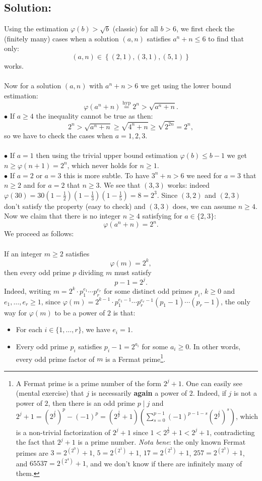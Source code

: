 \documentclass[11pt, a4paper, oneside]{article}
\newcommand{\solution}[1][]{\subsection*{#1}\hfill \par}
\theoremstyle{remark}
\theoremstyle{lemma}
\begin{document}
\solution[Solution:]
Using the estimation \(\varphi(b) > \sqrt{b}\) (classic) for all \(b > 6\), we first check the (finitely many) cases when a solution \((a,n)\) satisfies \(a^n + n \le 6\) to find that only:
\[
(a,n) \in \left\{ (2,1), (3,1), (5,1) \right\}
\]
works.
\\\\
Now for a solution \((a,n)\) with \(a^n + n > 6\) we get using the lower bound estimation:
\[
\varphi \left( a^n + n \right) \overset{\text{hyp}}{=} 2^n > \sqrt{a^n + n}.
\]
\(\bullet\) If \(a \ge 4\) the inequality cannot be true as then:
\[
2^n > \sqrt{a^n + n} \geq \sqrt{4^n + n} \geq \sqrt{2^{2n}} = 2^n,
\]
so we have to check the cases when \(a = 1, 2, 3\).
\\\\
\(\bullet\) If \(a = 1\) then using the trivial upper bound estimation \(\varphi(b) \leq b - 1\) we get \(n \geq \varphi(n + 1) = 2^n\), which never holds for \(n \geq 1\).
\\
\(\bullet\) If \(a = 2\) or \(a = 3\) this is more subtle. To have \(3^n + n > 6\) we need for \(a = 3\) that \(n \geq 2\) and for \(a = 2\) that \(n \geq 3\). We see that \((3,3)\) works: indeed \(\varphi(30) = 30 \left(1 - \frac{1}{2}\right) \left(1 - \frac{1}{3}\right) \left(1 - \frac{1}{5}\right) = 8 = 2^3\). Since \((3,2)\) and \((2,3)\) don't satisfy the property (easy to check) and \((3,3)\) does, we can assume \(n \geq 4\). Now we claim that there is no integer \(n \geq 4\) satisfying for \(a \in \{2,3\}\):
\[
\varphi \left( a^n + n \right) = 2^n.
\]
We proceed as follows:
\\\\
If an integer \( m \geq 2 \) satisfies
\[
\varphi(m) = 2^k,
\]
then every odd prime \( p \) dividing \( m \) must satisfy
\[
p - 1 = 2^j.
\]
Indeed, writing \(m = 2^k \cdot p_1^{e_1} \cdots p_r^{e_r}\) for some distinct odd primes \(p_i\), \(k \geq 0\) and \(e_1, \ldots, e_r \geq 1\), since \(\varphi(m) = 2^{k-1} \cdot p_1^{e_1 - 1} \cdots p_r^{e_r - 1} (p_1 - 1) \cdots (p_r - 1)\), the only way for \(\varphi(m)\) to be a power of \(2\) is that:
\begin{itemize}
    \item For each \(i \in \{1, \ldots, r\}\), we have \(e_i = 1\).
    \item Every odd prime \(p_i\) satisfies \(p_i - 1 = 2^{a_i}\) for some \(a_i \geq 0\). In other words, every odd prime factor of \( m \) is a Fermat prime\footnote{A Fermat prime is a prime number of the form \(2^j + 1\). One can easily see (mental exercise) that \(j\) is necessarily \textbf{again} a power of \(2\). Indeed, if \(j\) is not a power of \(2\), then there is an odd prime \(p \mid j\) and \(2^j + 1 = \left(2^{\frac{j}{p}}\right)^p - (-1)^p = \left(2^{\frac{j}{p}} + 1\right) \left( \sum_{s=0}^{p-1} (-1)^{p-1-s} \left(2^{\frac{j}{p}}\right)^s \right)\), which is a non-trivial factorization of \(2^j + 1\) since \(1 < 2^{\frac{j}{p}} + 1 < 2^j + 1\), contradicting the fact that \(2^j + 1\) is a prime number. \textit{Nota bene}: the only known Fermat primes are \(3 = 2^{(2^0)} + 1\), \(5 = 2^{(2^1)} + 1\), \(17 = 2^{(2^{2})} + 1\), \(257 = 2^{(2^{3})} + 1\), and \(65537 = 2^{(2^{4})} + 1\), and we don't know if there are infinitely many of them.}.
\end{itemize}
\end{document}
